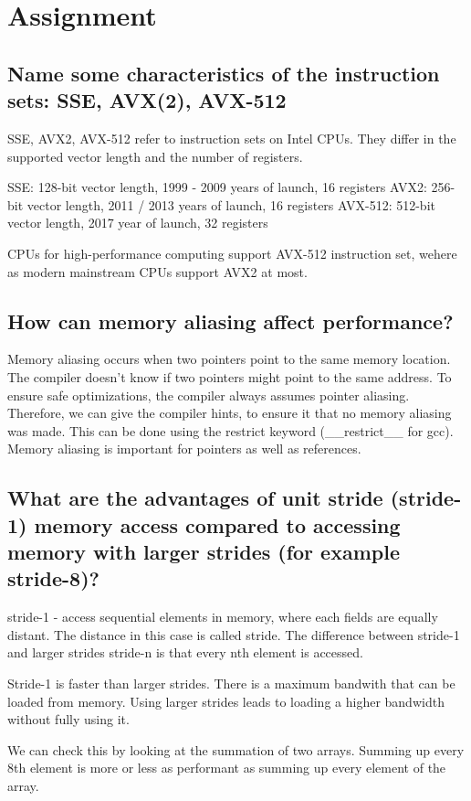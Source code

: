 \documentclass[runningheads]{llncs}
\begin{document}
\section{Assignment}

\subsection{Name some characteristics of the instruction sets: SSE, AVX(2), AVX-512}
SSE, AVX2, AVX-512 refer to instruction sets on Intel CPUs. They differ in the supported vector length and the number of registers.

SSE: 128-bit vector length, 1999 - 2009 years of launch, 16 registers
AVX2: 256-bit vector length, 2011 / 2013 years of launch, 16 registers
AVX-512: 512-bit vector length, 2017 year of launch, 32 registers

CPUs for high-performance computing support AVX-512 instruction set, wehere as modern mainstream CPUs support AVX2 at most.

\subsection{How can memory aliasing affect performance?}
Memory aliasing occurs when two pointers point to the same memory location.
The compiler doesn't know if two pointers might point to the same address. 
To ensure safe optimizations, the compiler always assumes pointer aliasing. 
Therefore, we can give the compiler hints, to ensure it that no memory aliasing was made.
This can be done using the restrict keyword (\*\_\_restrict\_\_ for gcc). Memory aliasing is important for pointers as well as references.

\subsection{What are the advantages of unit stride (stride-1) memory access compared to accessing memory with larger strides (for example stride-8)?}
stride-1 - access sequential elements in memory, where each fields are equally distant. The distance in this case is called stride.
The difference between stride-1 and larger strides stride-n is that every nth element is accessed.

Stride-1 is faster than larger strides. There is a maximum bandwith that can be loaded from memory. 
Using larger strides leads to loading a higher bandwidth without fully using it.

We can check this by looking at the summation of two arrays. 
Summing up every 8th element is more or less as performant as summing up every element of the array.
\end{document}

